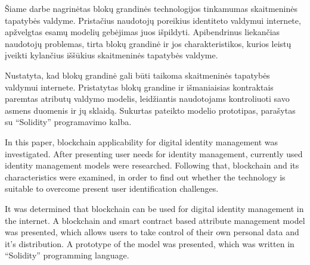 
Šiame darbe nagrinėtas blokų grandinės technologijos tinkamumas skaitmeninės tapatybės valdyme. Pristačius naudotojų poreikius identiteto valdymui internete,
apžvelgtas esamų modelių gebėjimas juos išpildyti. Apibendrinus liekančias naudotojų problemas, tirta blokų grandinė ir jos charakteristikos,
kurios leistų įveikti kylančius iššūkius skaitmeninės tapatybės valdyme.

Nustatyta, kad blokų grandinė gali būti taikoma skaitmeninės tapatybės valdymui internete. Pristatytas blokų grandine ir išmaniaisias kontraktais
paremtas atributų valdymo modelis,
leidžiantis naudotojams kontroliuoti savo asmens duomenis ir jų sklaidą. Sukurtas pateikto modelio prototipas, parašytas su \enquote{Solidity}
programavimo kalba.



In this paper, blockchain applicability for digital identity management was investigated. After presenting user needs for identity management,
currently used identity management models were researched. Following that, blockchain and its characteristics were examined,
in order to find out whether the technology is suitable
to overcome present user identification challenges.

It was determined that blockchain can be used for digital identity management in the internet. A blockchain and smart contract based attribute management model was presented,
which allows users to take control of their own personal data and it's distribution. A prototype of the model was presented,
which was written in \enquote{Solidity} programming language.

